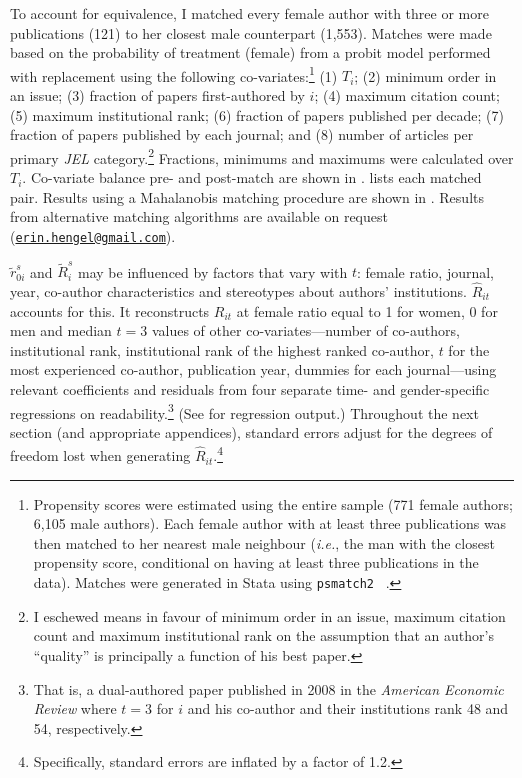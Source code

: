 To account for equivalence, I matched every female author with three or more publications (121) to her closest male counterpart (1,553). Matches were made based on the probability of treatment (female) from a probit model performed with replacement using the following co-variates:\footnote{Propensity scores were estimated using the entire sample (771 female authors; 6,105 male authors). Each female author with at least three publications was then matched to her nearest male neighbour (\emph{i.e.}, the man with the closest propensity score, conditional on having at least three publications in the data). Matches were generated in Stata using \texttt{psmatch2} ~\citep{Leuven2003}.} (1) $T_i$; (2) minimum order in an issue; (3) fraction of papers first-authored by $i$; (4) maximum citation count; (5) maximum institutional rank; (6) fraction of papers published per decade; (7) fraction of papers published by each journal; and (8) number of articles per primary \emph{JEL} category.\footnote{I eschewed means in favour of minimum order in an issue, maximum citation count and maximum institutional rank on the assumption that an author's ``quality'' is principally a function of his best paper.} Fractions, minimums and maximums were calculated over $T_i$. Co-variate balance pre- and post-match are shown in .  lists each matched pair. Results using a Mahalanobis matching procedure are shown in . Results from alternative matching algorithms are available on request (\href{mailto:erin.hengel@gmail.com}{\texttt{erin.hengel@gmail.com}}).

$\widetilde r_{0i}^s$ and $\widetilde R_i^s$ may be influenced by factors that vary with $t$: female ratio, journal, year, co-author characteristics and stereotypes about authors' institutions. $\widehat R_{it}$ accounts for this. It reconstructs $R_{it}$ at female ratio equal to 1 for women, 0 for men and median $t=3$ values of other co-variates---number of co-authors, institutional rank, institutional rank of the highest ranked co-author, $t$ for the most experienced co-author, publication year, dummies for each journal---using relevant coefficients and residuals from four separate time- and gender-specific regressions on readability.\footnote{That is, a dual-authored paper published in 2008 in the \emph{American Economic Review} where $t=3$ for $i$ and his co-author and their institutions rank 48 and 54, respectively.} (See  for regression output.) Throughout the next section (and appropriate appendices), standard errors adjust for the degrees of freedom lost when generating $\widehat R_{it}$.\footnote{Specifically, standard errors are inflated by a factor of 1.2.}

